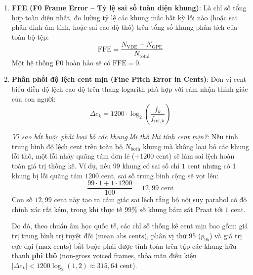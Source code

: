 \begin{enumerate}
    \item \textbf{FFE (F0 Frame Error -- Tỷ lệ sai số toàn diện khung)}:
    Là chỉ số tổng hợp toàn diện nhất, đo lường tỷ lệ các khung mắc bất kỳ lỗi nào (hoặc sai phân định âm tính, hoặc sai cao độ thô) trên tổng số khung phân tích của toàn bộ tệp:
    \begin{equation}
        \text{FFE} = \frac{N_{\text{VDE}} + N_{\text{GPE}}}{N_{\text{total}}}
        \label{eq:ffe_def}
    \end{equation}
    Một hệ thống F0 hoàn hảo sẽ có $\text{FFE} = 0$.

    \item \textbf{Phân phối độ lệch cent mịn (Fine Pitch Error in Cents)}:
    Đơn vị cent biểu diễn độ lệch cao độ trên thang logarith phù hợp với cảm nhận thính giác của con người:
    \begin{equation}
        \Delta c_k = 1200 \cdot \log_2\left( \frac{f_k}{f_{\text{ref}, k}} \right)
        \label{eq:cent_def}
    \end{equation}
    
    \emph{Vì sao bắt buộc phải loại bỏ các khung lỗi thô khi tính cent mịn?}:
    Nếu tính trung bình độ lệch cent trên toàn bộ $N_{\text{both}}$ khung mà không loại bỏ các khung lỗi thô, một lỗi nhảy quãng tám đơn lẻ ($+1200\text{ cent}$) sẽ làm sai lệch hoàn toàn giá trị thống kê. Ví dụ, nếu 99 khung có sai số chỉ $1\text{ cent}$ nhưng có 1 khung bị lỗi quãng tám $1200\text{ cent}$, sai số trung bình cộng sẽ vọt lên:
    \begin{equation}
        \frac{99 \cdot 1 + 1 \cdot 1200}{100} = 12{,}99\text{ cent}
    \end{equation}
    Con số $12{,}99\text{ cent}$ này tạo ra cảm giác sai lệch rằng bộ nội suy parabol có độ chính xác rất kém, trong khi thực tế $99\%$ số khung bám sát Praat tới $1\text{ cent}$. 
    
    Do đó, theo chuẩn âm học quốc tế, các chỉ số thống kê cent mịn bao gồm: giá trị trung bình trị tuyệt đối ($\text{mean abs cents}$), phân vị thứ 95 ($p_{95}$) và giá trị cực đại ($\text{max cents}$) bắt buộc phải được tính toán trên tập các khung hữu thanh \textbf{phi thô} (non-gross voiced frames, thỏa mãn điều kiện $|\Delta c_k| < 1200 \log_2(1{,}2) \approx 315{,}64\text{ cent}$).
\end{enumerate}

